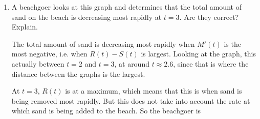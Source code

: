 \documentclass[main]{subfiles}
\begin{document}
\begin{enumerate}
\begin{enumerate}[resume,topsep=0pt]
        \begin{solution}
            $M(t)$ is
            decreasing when $M'(t)$ is negative. $M'(t)=S(t)-R(t)$.
            Looking at the graphs, we can see that $R(t)\geq S(t)$ on 
            the interval $[0,5]$ since the graph of $R$ crosses
            above the graph of $S$, so $M'(t)$ will be negative when
            $t<5$. 
            
            Therefore
            $M(t)$ is decreasing on the interval $\boxed{[0,5].}$
        \end{solution}

    \pspace{12pt}

    \item A beachgoer looks at this graph and determines that
    the total amount of sand on the beach is decreasing most rapidly
    at $t=3$. Are they correct? Explain.

    \begin{solution}
        The total amount of sand is decreasing most rapidly
        when $M'(t)$ is the most negative, i.e. when
        $R(t)-S(t)$ is largest. Looking at the graph, this actually
        between $t=2$ and $t=3$, at around $t\approx2.6$, since
        that is where the distance between the graphs is the largest.
        
        At $t=3$, $R(t)$ is at a maximum, which means that this is when sand is being removed most rapidly. But this does not
        take into account the rate at which sand is being added to the
        beach. So the beachgoer is 

    \begin{center}
    \end{center}
    \end{solution}


\end{enumerate}
\end{enumerate}
\end{document}
